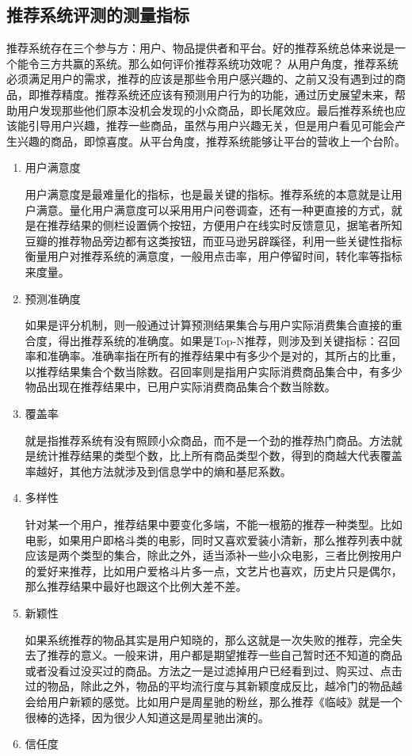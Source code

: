 		\subsection{推荐系统评测的测量指标}
		推荐系统存在三个参与方：用户、物品提供者和平台。好的推荐系统总体来说是一个能令三方共赢的系统。那么如何评价推荐系统功效呢？ 从用户角度，推荐系统必须满足用户的需求，推荐的应该是那些令用户感兴趣的、之前又没有遇到过的商品，即推荐精度。推荐系统还应该有预测用户行为的功能，通过历史展望未来，帮助用户发现那些他们原本没机会发现的小众商品，即长尾效应。最后推荐系统也应该能引导用户兴趣，推荐一些商品，虽然与用户兴趣无关，但是用户看见可能会产生兴趣的商品，即惊喜度。从平台角度，推荐系统能够让平台的营收上一个台阶。
			\begin{enumerate}[(1)]
			\item 用户满意度

			用户满意度是最难量化的指标，也是最关键的指标。推荐系统的本意就是让用户满意。量化用户满意度可以采用用户问卷调查，还有一种更直接的方式，就是在推荐结果的侧栏设置俩个按钮，方便用户在线实时反馈意见，据笔者所知豆瓣的推荐物品旁边都有这类按钮，而亚马逊另辟蹊径，利用一些关键性指标衡量用户对推荐系统的满意度，一般用点击率，用户停留时间，转化率等指标来度量。
			\item 预测准确度

			如果是评分机制，则一般通过计算预测结果集合与用户实际消费集合直接的重合度，得出推荐系统的准确度。如果是Top-N推荐，则涉及到关键指标：召回率和准确率。准确率指在所有的推荐结果中有多少个是对的，其所占的比重，以推荐结果集合个数当除数。召回率则是指用户实际消费商品集合中，有多少物品出现在推荐结果中，已用户实际消费商品集合个数当除数。
			\item 覆盖率

			就是指推荐系统有没有照顾小众商品，而不是一个劲的推荐热门商品。方法就是统计推荐结果的类型个数，比上所有商品类型个数，得到的商越大代表覆盖率越好，其他方法就涉及到信息学中的熵和基尼系数。
			\item 多样性

			针对某一个用户，推荐结果中要变化多端，不能一根筋的推荐一种类型。比如电影，如果用户即格斗类的电影，同时又喜欢爱装小清新，那么推荐列表中就应该是两个类型的集合，除此之外，适当添补一些小众电影，三者比例按用户的爱好来推荐，比如用户爱格斗片多一点，文艺片也喜欢，历史片只是偶尔，那么推荐结果中最好也跟这个比例大差不差。
			\item 新颖性

			如果系统推荐的物品其实是用户知晓的，那么这就是一次失败的推荐，完全失去了推荐的意义。一般来讲，用户都是期望推荐一些自己暂时还不知道的商品或者没看过没买过的商品。方法之一是过滤掉用户已经看到过、购买过、点击过的物品，除此之外，物品的平均流行度与其新颖度成反比，越冷门的物品越会给用户新颖的感觉。比如用户是周星驰的粉丝，那么推荐《临岐》就是一个很棒的选择，因为很少人知道这是周星驰出演的。
			\item 信任度


\end{enumerate}

